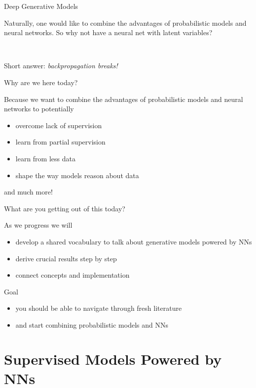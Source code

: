 \begin{frame}{Deep Generative Models}

	Naturally, one would like to combine the advantages of probabilistic models and neural networks. So why not have a neural net with latent variables?
	
	~ \pause
	
	Short answer: \emph{backpropagation breaks!}
\end{frame}

\begin{frame}{Why are we here today?}

	Because we want to combine the advantages of probabilistic models and neural networks to potentially 
	\begin{itemize}
		\item overcome lack of supervision
		\item learn from partial supervision
		\item learn from less data
		\item shape the way models reason about data
	\end{itemize}
	and much more!
	
\end{frame}

\begin{frame}{What are you getting out of this today?}

	As we progress we will
	\begin{itemize}
		\item develop a shared vocabulary to talk about generative models powered by NNs
		\item derive crucial results step by step
		\item connect concepts and implementation
	\end{itemize}

	\pause

	Goal
	\begin{itemize}
		\item you should be able to navigate through fresh literature
		\item and start combining probabilistic models and NNs
	\end{itemize}

\end{frame}

\section{Supervised Models Powered by NNs}
\frame{\tableofcontents[currentsection]}

